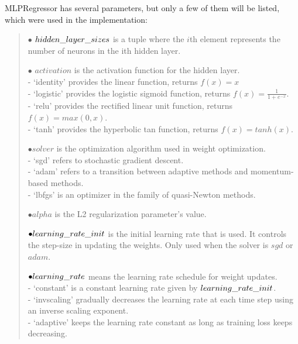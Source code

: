 \noindent MLPRegressor has several parameters, but only a few of them will be listed, which were used in the implementation:
\begin{verse}
	$\bullet$ $hidden\char`_layer\char`_sizes$ is a tuple where the $i$th element represents the number of neurons in the ith hidden layer.
	
	$\bullet$ $activation$ is the activation function for the hidden layer.\\
	\hspace{10pt} - ‘identity’ provides the linear function, returns $f(x) = x$\\
	\hspace{10pt} - ‘logistic’ provides the logistic sigmoid function, returns $f(x) = \frac{1}{1 + e^{-x}}.$\\
	\hspace{10pt} - ‘relu’ provides the rectified linear unit function, returns $f(x) = max(0, x)$. \\
	\hspace{10pt} - ‘tanh’ provides the hyperbolic tan function, returns $f(x) = tanh(x)$.
	
	$\bullet solver$ is the optimization algorithm used in weight optimization.\\
	\hspace{10pt} - ‘sgd’ refers to stochastic gradient descent.\\
	\hspace{10pt} - ‘adam’ refers to a transition between adaptive methods and momentum-based methods.\\
	\hspace{10pt} - ‘lbfgs’ is an optimizer in the family of quasi-Newton methods.
	
	$\bullet alpha$ is the L2 regularization parameter's value.
	
	$\bullet learning\char`_rate\char`_init$ is the initial learning rate that is used. It controls the step-size in updating the weights. Only used when the solver is $sgd$ or $adam$.
	
	$\bullet learning\char`_rate$ means the learning rate schedule for weight updates. \\
	\hspace{10pt} - ‘constant’ is a constant learning rate given by $learning\char`_rate\char`_init$.\\
	\hspace{10pt} - ‘invscaling’ gradually decreases the learning rate at each time step using an inverse scaling exponent.\\
	\hspace{10pt} - ‘adaptive’ keeps the learning rate constant as long as training loss keeps decreasing.
\end{verse}
